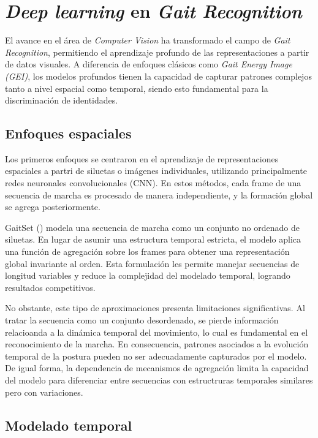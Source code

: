 \section{\textit{Deep learning} en \textit{Gait Recognition}}

El avance en el área de \textit{Computer Vision} ha transformado el campo de \textit{Gait Recognition}, permitiendo el aprendizaje profundo de las representaciones a partir de datos visuales. A diferencia de enfoques clásicos como \textit{Gait Energy Image (GEI)}, los modelos profundos tienen la capacidad de capturar patrones complejos tanto a nivel espacial como temporal, siendo esto fundamental para la discriminación de identidades.

\subsection{Enfoques espaciales}

Los primeros enfoques se centraron en el aprendizaje de representaciones espaciales a partri de siluetas o imágenes individuales, utilizando principalmente redes neuronales convolucionales (CNN). En estos métodos, cada frame de una secuencia de marcha es procesado de manera independiente, y la formación global se agrega posteriormente.

GaitSet () modela una secuencia de marcha como un conjunto no ordenado de siluetas. En lugar de asumir una estructura temporal estricta, el modelo aplica una función de agregación sobre los frames para obtener una representación global invariante al orden. Esta formulación les permite manejar secuencias de longitud variables y reduce la complejidad del modelado temporal, logrando resultados competitivos.

No obstante, este tipo de aproximaciones presenta limitaciones significativas. Al tratar la secuencia como un conjunto desordenado, se pierde información relacioanda a la dinámica temporal del movimiento, lo cual es fundamental en el reconocimiento de la marcha. En consecuencia, patrones asociados a la evolución temporal de la postura pueden no ser adecuadamente capturados por el modelo. De igual forma, la dependencia de mecanismos de agregación limita la capacidad del modelo para diferenciar entre secuencias con estructruras temporales similares pero con variaciones.

\subsection{Modelado temporal}

